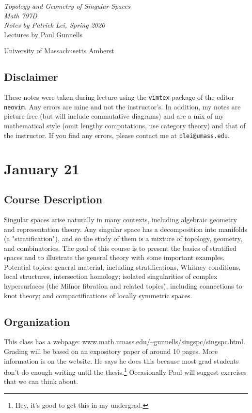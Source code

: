 \documentclass[leqno, openany]{memoir}
\theoremstyle{definition}
\theoremstyle{remark}
\theoremstyle{plain}
\theoremstyle{definition}
\theoremstyle{remark}
\newcommand*{\titleSW}
    {\begingroup%
    \raggedleft
    \vspace*{\baselineskip}
    {\Huge\itshape Topology and Geometry of Singular Spaces \\ Math 797D}\\[\baselineskip]
    {\large\itshape Notes by Patrick Lei,
                    Spring 2020}\\[0.2\textheight]
    {\Large Lectures by Paul Gunnells}\par
    \vfill
    {\Large \sffamily University of Massachusetts Amherst}
    \vspace*{\baselineskip}
\endgroup}
\begin{document}
    
\begin{titlingpage}
\titleSW
\end{titlingpage}

\thispagestyle{empty}
\section*{Disclaimer}%
\label{sec:disclaimer}

These notes were taken during lecture using the \texttt{vimtex} package of the
editor \texttt{neovim}.  Any errors are mine and not the instructor's.  In
addition, my notes are picture-free (but will include commutative diagrams) and
are a mix of my mathematical style (omit lengthy computations, use category
theory) and that of the instructor.  If you find any errors, please contact me
at \texttt{plei@umass.edu}.  \newpage



\tableofcontents

\chapter{January 21}%

\section{Course Description}%

Singular spaces arise naturally in many contexts, including algebraic geometry
and representation theory. Any singular space has a decomposition into
manifolds (a "stratification"), and so the study of them is a mixture of
topology, geometry, and combinatorics. The goal of this course is to present
the basics of stratified spaces and to illustrate the general theory with some
important examples. Potential topics: general material, including
stratifications, Whitney conditions, local structures, intersection homology;
isolated singularities of complex hypersurfaces (the Milnor fibration and
related topics), including connections to knot theory; and compactifications of
locally symmetric spaces.

\section{Organization}%

This class has a webpage:
\url{www.math.umass.edu/~gunnells/singspc/singspc.html}. Grading will be based
on an expository paper of around 10 pages. More information is on the website.
He says he does this because most grad students don't do enough writing until
the thesis.\footnote{Hey, it's good to get this in my undergrad.} Occasionally
Paul will suggest exercises that we can think about.
\end{document}

